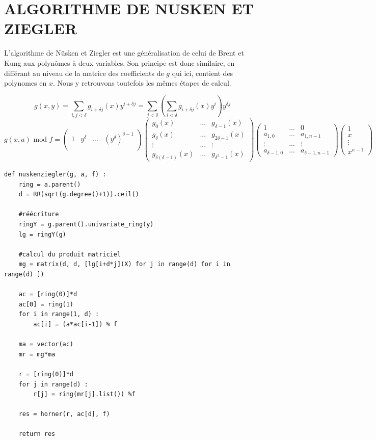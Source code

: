 \documentclass[a4paper]{article}
\begin{document}
\section{ALGORITHME DE NUSKEN ET ZIEGLER}

L'algorithme de Nüsken et Ziegler est une généralisation de celui de Brent et Kung aux polynômes à deux variables. 
Son principe est donc similaire, en différant au niveau de la matrice des coefficients de $g$ qui ici, contient des polynomes en $x$.
Nous y retrouvons toutefois les mêmes étapes de calcul.

\[
g(x,y) = \sum_{i,j<\delta}g_{i+\delta j}(x)y^{i+\delta j} = \sum_{j<\delta} \left( \sum_{i<\delta} g_{i+\delta j}(x)y^i \right) y^{\delta j}     
\]
\[
g(x, a)\text{ mod }f =
\begin{pmatrix}
    1 & y^\delta & ... & (y^\delta)^{\delta-1}  \\  
\end{pmatrix}
\begin{pmatrix}
    g_0(x) & ... & g_{\delta-1}(x) \\
    g_{\delta}(x) & ... & g_{2\delta-1}(x) \\
    \vdots & ... & \vdots \\
    g_{\delta(\delta-1)}(x) & ... & g_{\delta^2-1}(x)
\end{pmatrix}
\begin{pmatrix}
    1 &  ... & 0 \\
    a_{1,0} & ... & a_{1,n-1} \\
    \vdots &  ... & \vdots \\
    a_{\delta-1,0} & ... & a_{\delta-1,n-1}
\end{pmatrix}
\begin{pmatrix}
    1 \\
    x \\
    \vdots \\
    x^{n-1}
\end{pmatrix}
\]

\newpage

\begin{lstlisting}[title={nusken et ziegler}]
def nuskenziegler(g, a, f) :
    ring = a.parent()
    d = RR(sqrt(g.degree()+1)).ceil()

    #réécriture
    ringY = g.parent().univariate_ring(y)
    lg = ringY(g)

    #calcul du produit matriciel
    mg = matrix(d, d, [lg[i+d*j](X) for j in range(d) for i in range(d) ])

    ac = [ring(0)]*d
    ac[0] = ring(1)
    for i in range(1, d) :
        ac[i] = (a*ac[i-1]) % f

    ma = vector(ac)
    mr = mg*ma

    r = [ring(0)]*d
    for j in range(d) :
        r[j] = ring(mr[j].list()) %f
    
    res = horner(r, ac[d], f)

    return res
\end{lstlisting}
\end{document}
